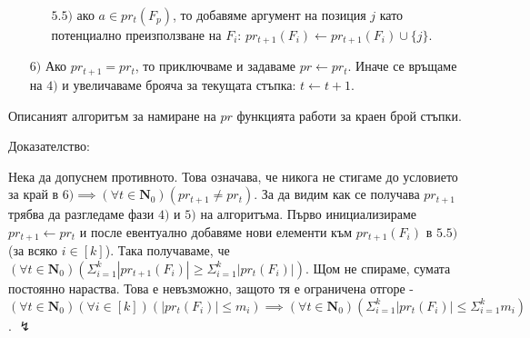 \documentclass[12pt,twoside,a4paper]{article}
\begin{document}
\begin{algorithm}
\begin{itemize}
\begin{itemize}
				\item[$5.5)$] ако $a \in pr_t(F_p)$, то добавяме аргумент на позиция $j$ като потенциално преизползване на $F_i$: $pr_{t+1}(F_i) \gets pr_{t+1}(F_i) \cup \{j\}$.
			\end{itemize}
			\item[$6)$] Ако $pr_{t+1} = pr_t$, то приключваме и задаваме $pr \gets pr_t$. Иначе се връщаме на $4)$ и увеличаваме брояча за текущата стъпка: $t \gets t + 1$.
		\end{itemize}
	\end{algorithm}
	
	\begin{statement}\label{stmnt:pr-fin} Описаният алгоритъм за намиране на $pr$ функцията работи за краен брой стъпки.
		
		\noindent Доказателство:
		
		Нека да допуснем противното. Това означава, че никога не стигаме до условието за край в $6) \implies (\forall t \in \mathbf{N}_0)(pr_{t+1} \neq pr_t)$. За да видим как се получава $pr_{t+1}$ трябва да разгледаме фази $4)$ и $5)$ на алгоритъма. Първо инициализираме $pr_{t+1} \gets pr_t$ и после евентуално добавяме нови елементи към $pr_{t+1}(F_i)$ в $5.5)$ (за всяко $i \in [k]$). Така получаваме, че $(\forall t \in \mathbf{N}_0)(\Sigma_{i=1}^k{|pr_{t+1}(F_i)|} \ge \Sigma_{i=1}^k{|pr_{t}(F_i)|})$. Щом не спираме, сумата постоянно нараства. Това е невъзможно, защото тя е ограничена отгоре - $(\forall t \in \mathbf{N}_0)(\forall i \in [k])(|pr_t(F_i)| \le m_i) \implies (\forall t \in \mathbf{N}_0)(\Sigma_{i=1}^k{|pr_{t}(F_i)|} \le \Sigma_{i=1}^k{m_i})$. $\lightning$
	\end{statement}
	
\end{document}
